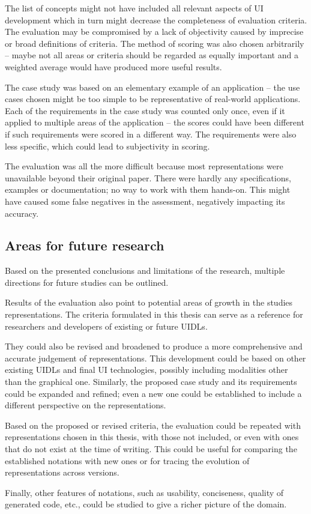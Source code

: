 The list of concepts might not have included all relevant aspects of UI development which in turn might decrease the completeness of evaluation criteria.
The evaluation may be compromised by a lack of objectivity caused by imprecise or broad definitions of criteria.
The method of scoring was also chosen arbitrarily -- maybe not all areas or criteria should be regarded as equally important and a weighted average would have produced more useful results.

The case study was based on an elementary example of an application -- the use cases chosen might be too simple to be representative of real-world applications.
Each of the requirements in the case study was counted only once, even if it applied to multiple areas of the application -- the scores could have been different if such requirements were scored in a different way.
The requirements were also less specific, which could lead to subjectivity in scoring.

The evaluation was all the more difficult because most representations were unavailable beyond their original paper.
There were hardly any specifications, examples or documentation; no way to work with them hands-on.
This might have caused some false negatives in the assessment, negatively impacting its accuracy.

\subsection{Areas for future research}\label{subsec:areas-for-future-research}

Based on the presented conclusions and limitations of the research, multiple directions for future studies can be outlined.

Results of the evaluation also point to potential areas of growth in the studies representations.
The criteria formulated in this thesis can serve as a reference for researchers and developers of existing or future UIDLs.

They could also be revised and broadened to produce a more comprehensive and accurate judgement of representations.
This development could be based on other existing UIDLs and final UI technologies, possibly including modalities other than the graphical one.
Similarly, the proposed case study and its requirements could be expanded and refined; even a new one could be established to include a different perspective on the representations.

Based on the proposed or revised criteria, the evaluation could be repeated with representations chosen in this thesis, with those not included, or even with ones that do not exist at the time of writing.
This could be useful for comparing the established notations with new ones or for tracing the evolution of representations across versions.

Finally, other features of notations, such as usability, conciseness, quality of generated code, etc., could be studied to give a richer picture of the domain.
